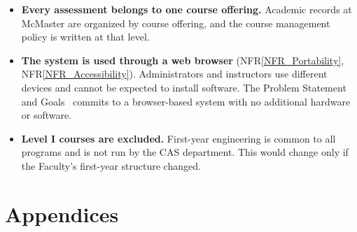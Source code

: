 \documentclass[12pt]{article}
\newcommand{\nfrref}[1]{NFR\ref{#1}}
\newcounter{lcnum} %
\newcounter{ulcnum} %
\begin{document}
\begin{itemize}
\item[ULC\refstepcounter{ulcnum}\theulcnum\label{ULC_AssessmentTerm}:]
  \textbf{Every assessment belongs to one course offering.} Academic
  records at McMaster are organized by course offering, and the course
  management policy is written at that level.

\item[ULC\refstepcounter{ulcnum}\theulcnum\label{ULC_WebDelivery}:]
  \textbf{The system is used through a web browser}
  (\nfrref{NFR_Portability}, \nfrref{NFR_Accessibility}). Administrators and instructors use different
  devices and cannot be expected to install software. The Problem Statement and Goals~\citep{TeamBVSH2026PS}
  commits to a browser-based system with no additional hardware or software.

\item[ULC\refstepcounter{ulcnum}\theulcnum\label{ULC_FirstYear}:]
  \textbf{Level I courses are excluded.} First-year engineering is common to
  all programs and is not run by the CAS department. This would change only
  if the Faculty's first-year structure changed.

\end{itemize}

\newpage{}

\section{Appendices}




\end{document}
